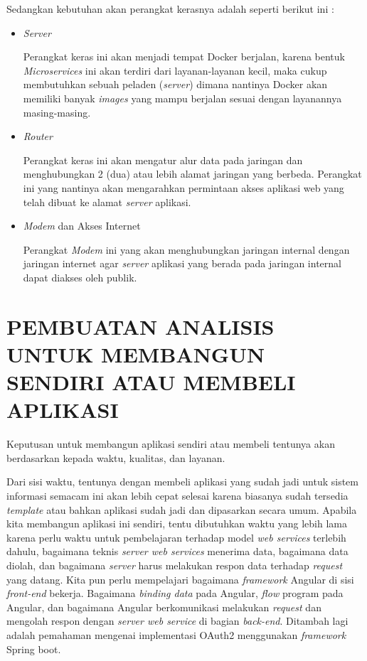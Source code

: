 \documentclass[pdftex,12pt, oneside]{article}
\begin{document}
Sedangkan kebutuhan akan perangkat kerasnya adalah seperti berikut ini :

\begin{itemize}
	\item \textit{Server} 
	
Perangkat keras ini akan menjadi tempat Docker berjalan, karena bentuk \textit{Microservices} ini akan terdiri dari layanan-layanan kecil, maka cukup membutuhkan sebuah peladen (\textit{server}) dimana nantinya Docker akan memiliki banyak \textit{images} yang mampu berjalan sesuai dengan layanannya masing-masing.
	
	\item \textit{Router}
	
Perangkat keras ini akan mengatur alur data pada jaringan dan menghubungkan 2 (dua) atau lebih alamat jaringan yang berbeda. Perangkat ini yang nantinya akan mengarahkan permintaan akses aplikasi web yang telah dibuat ke alamat \textit{server} aplikasi.
	
	\item \textit{Modem} dan Akses Internet	
	
Perangkat \textit{Modem} ini yang akan menghubungkan jaringan internal dengan jaringan internet agar \textit{server} aplikasi yang berada pada jaringan internal dapat diakses oleh publik.	
	
\end{itemize}

\section{PEMBUATAN ANALISIS UNTUK MEMBANGUN SENDIRI ATAU MEMBELI APLIKASI}

Keputusan untuk membangun aplikasi sendiri atau membeli tentunya akan berdasarkan kepada waktu, kualitas, dan layanan. 

Dari sisi waktu, tentunya dengan membeli aplikasi yang sudah jadi untuk sistem informasi semacam ini akan lebih cepat selesai karena biasanya sudah tersedia \textit{template} atau bahkan aplikasi sudah jadi dan dipasarkan secara umum. Apabila kita membangun aplikasi ini sendiri, tentu dibutuhkan waktu yang lebih lama karena perlu waktu untuk pembelajaran terhadap model \textit{web services} terlebih dahulu, bagaimana teknis \textit{server web services} menerima data, bagaimana data diolah, dan bagaimana \textit{server} harus melakukan respon data terhadap \textit{request} yang datang. Kita pun perlu mempelajari bagaimana \textit{framework} Angular di sisi \textit{front-end} bekerja. Bagaimana \textit{binding data} pada Angular, \textit{flow} program pada Angular, dan bagaimana Angular berkomunikasi melakukan \textit{request} dan mengolah respon dengan \textit{server web service} di bagian \textit{back-end}. Ditambah lagi adalah pemahaman mengenai implementasi OAuth2 menggunakan \textit{framework} Spring boot.
\end{document}
